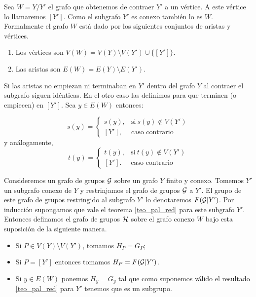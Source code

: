 \documentclass[tesis.tex]{subfiles}
\begin{document}
Sea $W = Y / Y'$  el grafo que obtenemos de contraer $Y'$ a un vértice.
A este vértice lo llamaremos $[Y']$. 
Como el subgrafo $Y'$ es conexo también lo es $W$.
Formalmente el grafo $W$ está dado por los siguientes conjuntos de aristas y vértices.

\begin{enumerate}
	\item Los vértices son $V(W)= V(Y) \setminus V(Y') \cup \{ [Y'] \}$.
	\item Las aristas son $E(W) = E(Y) \setminus E(Y')$.
\end{enumerate}

Si las aristas no empiezan ni terminaban en $Y'$ dentro del grafo $Y$ al contraer el subgrafo siguen idénticas. 
En el otro caso las definimos para que terminen (o empiecen) en $[Y']$. 
Sea $y \in E(W)$ entonces:

\begin{equation*}
	s(y) = 
	\begin{cases}
	s(y),  & \text{si} \ s(y) \notin V(Y') \\ 
	[Y'], & \text{caso contrario}
	\end{cases}
\end{equation*}
y análogamente,
\begin{equation*}
	t(y) = 
	\begin{cases}
		t(y),  & \text{si} \ t(y) \notin V(Y') \\ 
		[Y']. & \text{caso contrario}
	\end{cases}
\end{equation*}


Consideremos un grafo de grupos ${\cal G}$ sobre un grafo $Y$ finito y conexo. 
Tomemos $Y'$ un subgrafo conexo de $Y$ y restrinjamos el grafo de grupos ${\cal G}$ a $Y'$. 
El grupo de este grafo de grupos restringido al subgrafo $Y'$ lo denotaremos $F({\cal G} | Y')$.
Por inducción supongamos que vale el teorema \ref{teo_pal_red} para este subgrafo $Y'$.
Entonces definamos el grafo de grupos $\cal H$ sobre el grafo conexo $W$ bajo esta suposición de la siguiente manera.
\begin{itemize}
	\item Si $P \in V(Y) \setminus V(Y')$, tomamos $H_P = G_P$;
	\item Si $P = [Y']$ entonces tomamos $H_P = F({\cal G} | Y')$.
	\item Si $y \in E(W)$ ponemos $H_y = G_y$ tal que como suponemos válido el resultado \ref{teo_pal_red} para $Y'$ tenemos que es un subgrupo.
\end{itemize}
\end{document}
